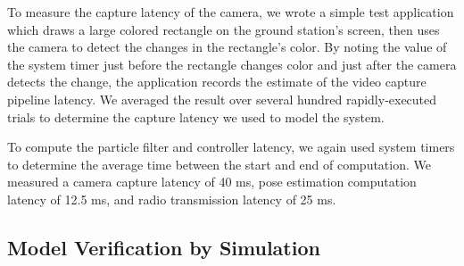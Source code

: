 \documentclass{aamas2013}
\begin{document}
To measure the capture latency of the camera, we wrote a simple test
application which draws a large colored rectangle on the ground station's
screen, then uses the camera to detect the changes in the rectangle's color.
By noting the value of the system timer just before the rectangle changes
color and just after the camera detects the change, the application records
the estimate of the video capture pipeline latency. We averaged the result
over several hundred rapidly-executed trials to determine the capture latency
we used to model the system.

To compute the particle filter and controller latency, we again used system 
timers to determine the average time between the start and end of computation.
We measured a camera capture latency of 40 ms, pose estimation computation 
latency of 12.5 ms, and radio transmission latency of 25 ms.
\subsection{Model Verification by Simulation}

\end{document}
